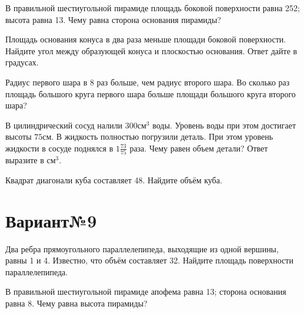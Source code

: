 \documentclass[4apaper]{article}
\begin{document}
\begin{taskBN}{2}
В правильной шестиугольной пирамиде площадь боковой поверхности равна 252; высота равна 13. Чему равна сторона основания пирамиды?
\end{taskBN}

\begin{taskBN}{3}
Площадь основания конуса в два раза меньше площади боковой поверхности. Найдите угол между образующей конуса и плоскостью основания. Ответ дайте в градусах.
\end{taskBN}

\begin{taskBN}{4}
Радиус первого шара в 8 раз больше, чем радиус второго шара. Во сколько раз площадь большого круга первого шара больше площади большого круга второго шара?
\end{taskBN}

\begin{taskBN}{5}
В цилиндрический сосуд налили $300\mbox{см}^3$ воды. Уровень воды при этом достигает высоты $75$см. В жидкость полностью погрузили деталь. При этом уровень жидкости в сосуде поднялся в ${1}\frac{73}{75}$ раза. Чему равен объем детали? Ответ выразите в $\mbox{см}^3$.
\end{taskBN}

\begin{taskBN}{6}
Квадрат диагонали куба составляет 48. Найдите объём куба.
\end{taskBN}
\newpage\section*{Вариант№9}

\begin{taskBN}{1}
Два ребра прямоугольного параллелепипеда, выходящие из одной вершины, равны 1 и 4. Известно, что объём составляет 32. Найдите площадь поверхности параллелепипеда.
\end{taskBN}

\begin{taskBN}{2}
В правильной шестиугольной пирамиде апофема равна 13; сторона основания равна 8. Чему равна высота пирамиды?
\end{taskBN}
\end{document}
